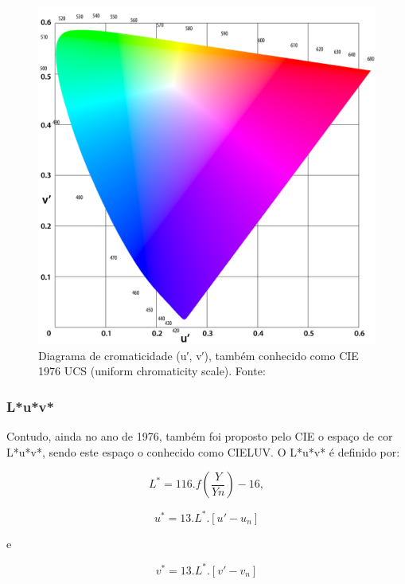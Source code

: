 \documentclass[a4paper,10pt]{report}
\begin{document}
\begin{figure}[!htb]
     \centering
     \includegraphics[scale=0.2]{img/cie_1976_luv.png}
     \caption{Diagrama de cromaticidade (u′, v′), também conhecido como CIE 1976
UCS (uniform chromaticity scale). Fonte:
}
     \label{fig:cie_1976_luv}
\end{figure}

\subsubsection{L*u*v*}
\par
Contudo, ainda no ano de 1976, também foi proposto pelo CIE o espaço de cor
L*u*v*, sendo este espaço o conhecido como CIELUV. O L*u*v* é definido por:

\begin{equation}\label{eq:L*u*v*_L*}
L^*=116.f(\frac{Y}{Yn})-16,
\end{equation}

\begin{equation}\label{eq:L*u*v*_u*}
u^*=13.L^*.[u'-u_n]
\end{equation}

e

\begin{equation}\label{eq:L*u*v*_v*}
v^*=13.L^*.[v'-v_n]
\end{equation}
\end{document}
